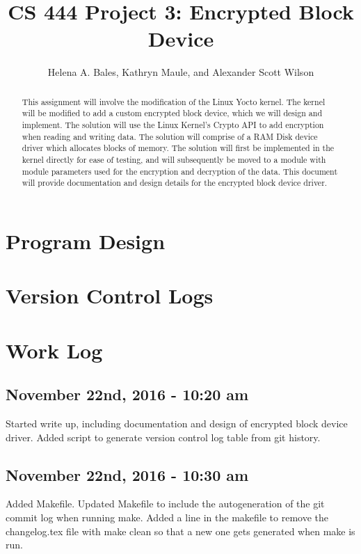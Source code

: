 \documentclass[letterpaper,10pt]{article}
\title{CS 444 Project 3: Encrypted Block Device}
\author{Helena A. Bales, Kathryn Maule, and Alexander Scott Wilson }
\begin{document}
\maketitle

\begin{abstract}
This assignment will involve the modification of the Linux Yocto kernel. 
The kernel will be modified to add a custom encrypted block device, which we will design and implement. 
The solution will use the Linux Kernel's Crypto API to add encryption when reading and writing data. 
The solution will comprise of a RAM Disk device driver which allocates blocks of memory. 
The solution will first be implemented in the kernel directly for ease of testing, and will subsequently
 be moved to a module with module parameters used for the encryption and decryption of the data. 
This document will provide documentation and design details for the encrypted block device driver.
\end{abstract}

\clearpage

\tableofcontents

\clearpage

\section{Program Design}

\section{Version Control Logs}


\section{Work Log}
\subsection{November 22nd, 2016 - 10:20 am}
Started write up, including documentation and design of encrypted block device driver. 
Added script to generate version control log table from git history.

\subsection{November 22nd, 2016 - 10:30 am}
Added Makefile. Updated Makefile to include the autogeneration of the git commit log when running make. 
Added a line in the makefile to remove the changelog.tex file with make clean so that a new one gets 
generated when make is run.
\end{document}
